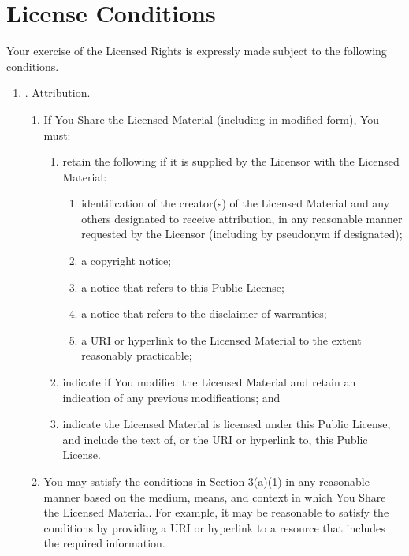 \section{License Conditions}

Your exercise of the Licensed Rights is expressly made subject to the
following conditions.

\begin{enumerate}[label=\alph*.]
\item. Attribution.
  \begin{enumerate}[label=\arabic*.]

  \item If You Share the Licensed Material (including in modified
    form), You must:

    \begin{enumerate}[label=\alph*.]
    \item retain the following if it is supplied by the Licensor with
      the Licensed Material:

      \begin{enumerate}[label=\roman*.]
      \item identification of the creator(s) of the Licensed Material
        and any others designated to receive attribution, in any
        reasonable manner requested by the Licensor (including by
        pseudonym if designated);
      \item a copyright notice;
      \item a notice that refers to this Public License;
      \item a notice that refers to the disclaimer of warranties;
      \item a URI or hyperlink to the Licensed Material to the extent
        reasonably practicable;
      \end{enumerate}

    \item indicate if You modified the Licensed Material and retain an
      indication of any previous modifications; and

    \item indicate the Licensed Material is licensed under this Public
      License, and include the text of, or the URI or hyperlink to,
      this Public License.
    \end{enumerate}

  \item You may satisfy the conditions in Section 3(a)(1) in any
    reasonable manner based on the medium, means, and context in which
    You Share the Licensed Material. For example, it may be reasonable
    to satisfy the conditions by providing a URI or hyperlink to a
    resource that includes the required information.


\end{enumerate}
\end{enumerate}
